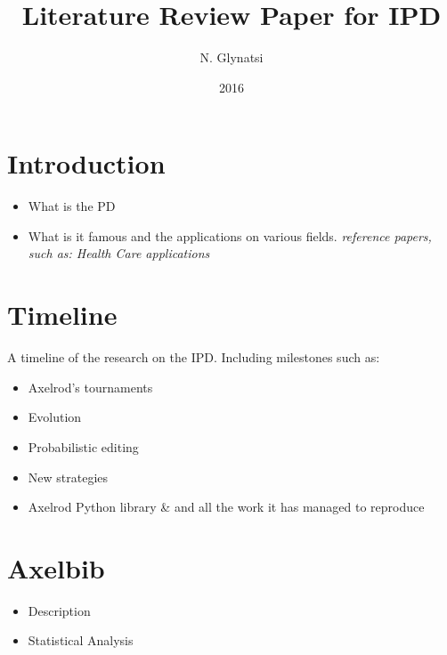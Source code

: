 \documentclass{article}
\title{Literature Review Paper for IPD}
\author{N. Glynatsi}
\date{2016}
\begin{document}
\maketitle

\section{Introduction}

    \begin{itemize}
        \item What is the PD
        \item What is it famous and the applications on various fields.
              \textit{reference papers, such as: Health Care applications}
    \end{itemize}

\section{Timeline}
A timeline of the research on the IPD. Including milestones such as:
\begin{itemize}
    \item Axelrod's tournaments
    \item Evolution
    \item Probabilistic editing
    \item New strategies
    \item Axelrod Python library \& and all the work it has managed to reproduce
\end{itemize}

\section{Axelbib}
    \begin{itemize}
        \item Description
        \item Statistical Analysis
    \end{itemize}
\end{document}
